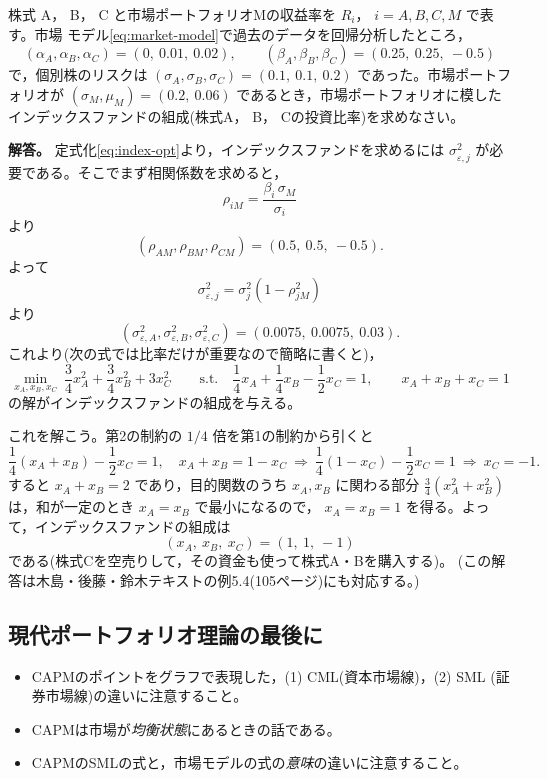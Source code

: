 \begin{example}[例題1：インデックスファンドの組成]
株式 A， B， C と市場ポートフォリオMの収益率を $R_i$， $i=A,B,C,M$ で表す。市場
モデル\eqref{eq:market-model}で過去のデータを回帰分析したところ，
\[
(\alpha_A,\alpha_B,\alpha_C) = (0,\ 0.01,\ 0.02),\qquad
(\beta_A,\beta_B,\beta_C) = (0.25,\ 0.25,\ -0.5)
\]
で，個別株のリスクは
$(\sigma_A,\sigma_B,\sigma_C) = (0.1,\ 0.1,\ 0.2)$ であった。市場ポートフォリオが
$(\sigma_M,\mu_M) = (0.2,\ 0.06)$ であるとき，市場ポートフォリオに模した
インデックスファンドの組成(株式A， B， Cの投資比率)を求めなさい。

\medskip
\noindent\textbf{解答。}
定式化\eqref{eq:index-opt}より，インデックスファンドを求めるには
$\sigma_{\varepsilon,j}^2$ が必要である。そこでまず相関係数を求めると，
\[
\rho_{iM} = \frac{\beta_i\,\sigma_M}{\sigma_i}
\]
より
\[
(\rho_{AM},\rho_{BM},\rho_{CM}) = (0.5,\ 0.5,\ -0.5).
\]
よって
\[
\sigma_{\varepsilon,j}^2 = \sigma_j^2(1 - \rho_{jM}^2)
\]
より
\[
(\sigma_{\varepsilon,A}^2,\sigma_{\varepsilon,B}^2,\sigma_{\varepsilon,C}^2)
= (0.0075,\ 0.0075,\ 0.03).
\]
これより(次の式では比率だけが重要なので簡略に書くと)，
\[
\min_{x_A,x_B,x_C}\ \frac{3}{4}x_A^2 + \frac{3}{4}x_B^2 + 3x_C^2
\qquad\text{s.t.}\quad
\frac{1}{4}x_A + \frac{1}{4}x_B - \frac{1}{2}x_C = 1,\qquad
x_A + x_B + x_C = 1
\]
の解がインデックスファンドの組成を与える。

これを解こう。第2の制約の $1/4$ 倍を第1の制約から引くと
\[
\frac{1}{4}(x_A+x_B) - \frac{1}{2}x_C = 1,\quad x_A+x_B = 1 - x_C
\ \Longrightarrow\
\frac{1}{4}(1-x_C) - \frac{1}{2}x_C = 1
\ \Longrightarrow\ x_C = -1.
\]
すると $x_A + x_B = 2$ であり，目的関数のうち $x_A,x_B$ に関わる部分
$\frac{3}{4}(x_A^2+x_B^2)$ は，和が一定のとき $x_A = x_B$ で最小になるので，
$x_A = x_B = 1$ を得る。よって，インデックスファンドの組成は
\[
(x_A,\ x_B,\ x_C) = (1,\ 1,\ -1)
\]
である(株式Cを空売りして，その資金も使って株式A・Bを購入する)。
(この解答は木島・後藤・鈴木テキストの例5.4(105ページ)にも対応する。)
\end{example}

\vspace{18pt}

\subsection{現代ポートフォリオ理論の最後に}

\begin{keypoint}[まとめの注意]
\begin{itemize}
\item CAPMのポイントをグラフで表現した，(1) CML(資本市場線)，(2) SML
(証券市場線)の違いに注意すること。
\item CAPMは市場が\emph{均衡状態}にあるときの話である。
\item CAPMのSMLの式と，市場モデルの式の\emph{意味}の違いに注意すること。
\end{itemize}
\end{keypoint}

